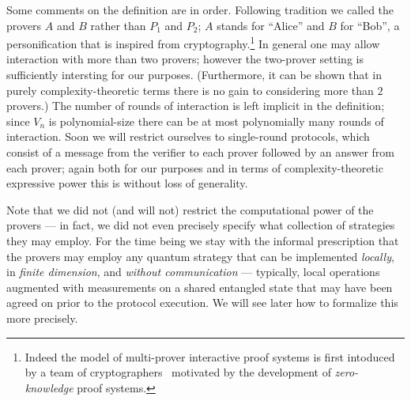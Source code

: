 Some comments on the definition are in order. Following tradition we called the provers $A$ and $B$ rather than $P_1$ and $P_2$; $A$ stands for ``Alice'' and $B$ for ``Bob'', a personification that is inspired from cryptography.\footnote{Indeed the model of multi-prover interactive proof systems is first intoduced by a team of cryptographers~\cite{ben2019multi} motivated by the development of \emph{zero-knowledge} proof systems.}
 In general one may allow interaction with more than two provers; however the two-prover setting is sufficiently intersting for our purposes. (Furthermore, it can be shown that in purely complexity-theoretic terms there is no gain to considering more than $2$ provers.) The number of rounds of interaction is left implicit in the definition; since $V_n$ is polynomial-size there can be at most polynomially many rounds of interaction. Soon we will restrict ourselves to single-round protocols, which consist of a message from the verifier to each prover followed by an answer from each prover; again both for our purposes and in terms of complexity-theoretic expressive power this is without loss of generality.  

Note that we did not (and will not) restrict the computational power of the provers --- in fact, we did not even precisely specify what collection of strategies they may employ. For the time being we stay with the informal prescription that the provers may employ any quantum strategy that can be implemented \emph{locally}, in \emph{finite dimension}, and \emph{without communication} --- typically, local operations augmented with measurements on a shared entangled state that may have been agreed on prior to the protocol execution. We will see later how to formalize this more precisely. 

\medskip

